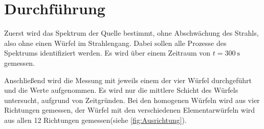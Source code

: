 \section{Durchführung}
\label{sec:Durchführung}
Zuerst wird das Spektrum der Quelle bestimmt, ohne Abschwächung des Strahls, also ohne einen Würfel im Strahlengang.
Dabei sollen alle Prozesse des Spektrums identifiziert werden.
Es wird über einem Zeitraum  von $t = \qty{300}{\second}$ gemessen.

Anschließend wird die Messung mit jeweils einem der vier Würfel durchgeführt und die Werte aufgenommen.
Es wird nur die mittlere Schicht des Würfels untersucht, aufgrund von Zeitgründen.
Bei den homogenen Würfeln wird aus vier Richtungen gemessen, der Würfel mit den verschiedenen 
Elementarwürfeln wird aus allen 12 Richtungen gemessen(siehe \autoref{fig:Ausrichtung}).